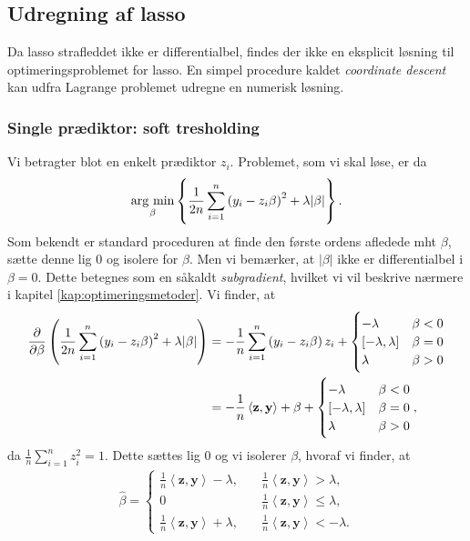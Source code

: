 \subsection{Udregning af lasso} \label{subsec:udregning_lasso}
Da lasso strafleddet ikke er differentialbel, findes der ikke en eksplicit løsning til optimeringsproblemet for lasso.
En simpel procedure kaldet \textit{coordinate descent} kan udfra Lagrange problemet udregne en numerisk løsning. 

\subsubsection{Single prædiktor: soft tresholding}
Vi betragter blot en enkelt prædiktor \(z_i\). 
Problemet, som vi skal løse, er da
\begin{align*}
\argmin_{\beta} \cbr{\frac{1}{2n} \sum_{i=1}^n \del{y_i - z_{i} \beta}^2 + \lambda \vert \beta \vert}.
\end{align*}
Som bekendt er standard proceduren at finde den første ordens afledede mht $\beta$, sætte denne lig 0 og isolere for $\beta$. 
Men vi bemærker, at \(\vert \beta \vert \) ikke er differentialbel i $\beta=0$.
Dette betegnes som en såkaldt \textit{subgradient}, hvilket vi vil beskrive nærmere i kapitel \ref{kap:optimeringsmetoder}.
Vi finder, at
\begin{align*}
\frac{\partial}{\partial \beta} \del{\frac{1}{2n} \sum_{i=1}^n \del{y_i - z_{i} \beta}^2 + \lambda \vert \beta \vert}
&= -\frac{1}{n} \sum_{i=1}^n \del{y_i - z_{i} \beta} z_i + \begin{cases}
-\lambda \quad &\beta < 0 \\
[-\lambda, \lambda] & \beta = 0 \\
\lambda & \beta >0 
\end{cases}  \\
&= -\frac{1}{n} \left\langle \mathbf{z}, \mathbf{y} \right\rangle + \beta + \begin{cases}
-\lambda \quad &\beta < 0 \\
[-\lambda, \lambda] & \beta = 0 \\
\lambda & \beta >0 
\end{cases},
\end{align*}
da $\frac{1}{n} \sum_{i=1}^n z_i^2=1$. Dette sættes lig 0 og vi isolerer $\beta$, hvoraf vi finder, at
\begin{align}
\hat{\beta} = \begin{cases}
\frac{1}{n} \left\langle \mathbf{z}, \mathbf{y} \right\rangle - \lambda, \quad &\frac{1}{n} \left\langle \mathbf{z}, \mathbf{y} \right\rangle > \lambda, \\
0 &\frac{1}{n} \left\langle \mathbf{z}, \mathbf{y} \right\rangle \leq \lambda, \\
\frac{1}{n} \left\langle \mathbf{z}, \mathbf{y} \right\rangle + \lambda, &\frac{1}{n} \left\langle \mathbf{z}, \mathbf{y} \right\rangle < -\lambda.
\end{cases} \label{eq:2.10}
\end{align}
